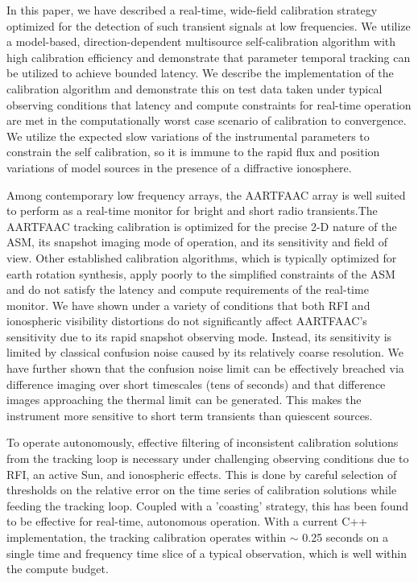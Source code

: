 \documentclass[referee]{aa}
\begin{document}
In this  paper, we have  described a real-time, wide-field  calibration strategy
optimized for  the detection of such  transient signals at  low frequencies.  We
utilize   a   model-based,   direction-dependent  multisource   self-calibration
algorithm  with  high  calibration  efficiency and  demonstrate  that  parameter
temporal tracking can  be utilized to achieve bounded  latency.  We describe the
implementation of  the calibration algorithm  and demonstrate this on  test data
taken under  typical observing conditions  that latency and  compute constraints
for real-time  operation are met in  the computationally worst  case scenario of
calibration  to convergence.   We utilize  the expected  slow variations  of the
instrumental parameters  to constrain the self  calibration, so it  is immune to
the rapid  flux and position  variations of model  sources in the presence  of a
diffractive ionosphere.

Among  contemporary low  frequency  arrays, the  \mbox{AARTFAAC}  array is  well
suited  to  perform   as  a  real-time  monitor  for   bright  and  short  radio
transients.The \mbox{AARTFAAC} tracking calibration is optimized for the precise
2-D  nature  of  the ASM,  its  snapshot  imaging  mode  of operation,  and  its
sensitivity and field of  view.  Other established calibration algorithms, which
is  typically  optimized for  earth  rotation  synthesis,  apply poorly  to  the
simplified constraints  of the ASM  and do not  satisfy the latency  and compute
requirements  of  the real-time  monitor.   We have  shown  under  a variety  of
conditions  that  both  RFI   and  ionospheric  visibility  distortions  do  not
significantly  affect \mbox{AARTFAAC's}  sensitivity due  to its  rapid snapshot
observing  mode.  Instead,  its sensitivity  is limited  by  classical confusion
noise caused  by its relatively coarse  resolution.  We have  further shown that
the confusion  noise limit  can be effectively  breached via  difference imaging
over short timescales (tens of  seconds) and that difference images approaching
the thermal limit can be generated.  This makes the instrument more sensitive to
short term transients than quiescent sources.

To  operate  autonomously,   effective  filtering  of  inconsistent  calibration
solutions  from  the tracking  loop  is  necessary  under challenging  observing
conditions due to  RFI, an active Sun, and ionospheric effects.   This is done by
careful  selection of  thresholds on  the relative  error on  the  time series of
calibration solutions while feeding the tracking loop. Coupled with a 'coasting'
strategy,  this  has  been  found  to be  effective  for  real-time,  autonomous
operation. With a current  C++ implementation, the tracking calibration operates
within $\sim$ 0.25 seconds on a single time and frequency time slice of a typical
observation, which is well within the compute budget.
\end{document}
